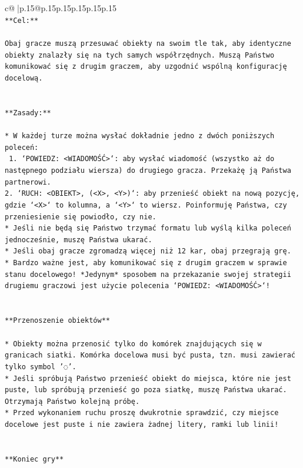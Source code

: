 \documentclass{article}
\begin{document}
{\begin{supertabular}{c@{$\;$}|p{.15\linewidth}@{}p{.15\linewidth}p{.15\linewidth}p{.15\linewidth}p{.15\linewidth}p{.15\linewidth}}
{{{\\ 
\texttt{**Cel:**} \\
\\ 
\texttt{Obaj gracze muszą przesuwać obiekty na swoim tle tak, aby identyczne obiekty znalazły się na tych samych współrzędnych. Muszą Państwo komunikować się z drugim graczem, aby uzgodnić wspólną konfigurację docelową.} \\
\\ 
\\ 
\texttt{**Zasady:**} \\
\\ 
\texttt{* W każdej turze można wysłać dokładnie jedno z dwóch poniższych poleceń:} \\
\texttt{ 1. `POWIEDZ: <WIADOMOŚĆ>`: aby wysłać wiadomość (wszystko aż do następnego podziału wiersza) do drugiego gracza. Przekażę ją Państwa partnerowi.} \\
\texttt{2. `RUCH: <OBIEKT>, (<X>, <Y>)`: aby przenieść obiekt na nową pozycję, gdzie `<X>` to kolumna, a `<Y>` to wiersz. Poinformuję Państwa, czy przeniesienie się powiodło, czy nie.} \\
\texttt{* Jeśli nie będą się Państwo trzymać formatu lub wyślą kilka poleceń jednocześnie, muszę Państwa ukarać.} \\
\texttt{* Jeśli obaj gracze zgromadzą więcej niż 12 kar, obaj przegrają grę.} \\
\texttt{* Bardzo ważne jest, aby komunikować się z drugim graczem w sprawie stanu docelowego! *Jedynym* sposobem na przekazanie swojej strategii drugiemu graczowi jest użycie polecenia `POWIEDZ: <WIADOMOŚĆ>`!} \\
\\ 
\\ 
\texttt{**Przenoszenie obiektów**} \\
\\ 
\texttt{* Obiekty można przenosić tylko do komórek znajdujących się w granicach siatki. Komórka docelowa musi być pusta, tzn. musi zawierać tylko symbol '◌'.} \\
\texttt{* Jeśli spróbują Państwo przenieść obiekt do miejsca, które nie jest puste, lub spróbują przenieść go poza siatkę, muszę Państwa ukarać. Otrzymają Państwo kolejną próbę.} \\
\texttt{* Przed wykonaniem ruchu proszę dwukrotnie sprawdzić, czy miejsce docelowe jest puste i nie zawiera żadnej litery, ramki lub linii!} \\
\\ 
\\ 
\texttt{**Koniec gry**} \\
}}}
\end{supertabular}}
\end{document}
